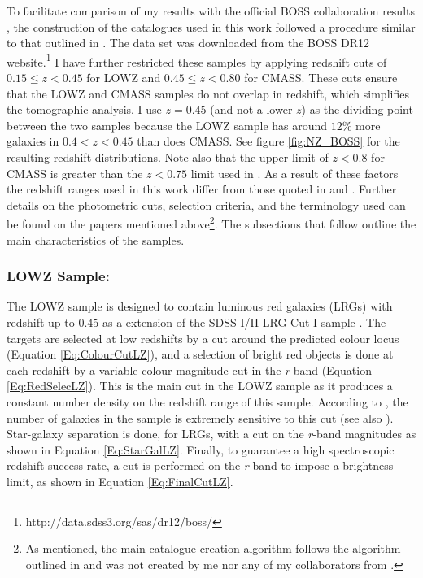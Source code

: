 To facilitate comparison of my results with the official BOSS collaboration results \citep{2016BOSSCosmology}, the construction of the catalogues used in this work followed a procedure similar to that outlined in \cite{BOSSCatalogue2016}. The data set was downloaded from the BOSS DR12 website.\footnote{http://data.sdss3.org/sas/dr12/boss/} I have further restricted these samples by applying redshift cuts of $0.15 \leq z < 0.45$ for LOWZ and $0.45 \leq z < 0.80$ for CMASS. These cuts ensure that the LOWZ and CMASS samples do not overlap in redshift, which simplifies the tomographic analysis. I use $z = 0.45$ (and not a lower $z$) as the dividing point between the two samples because the LOWZ sample has around $12\%$ more galaxies in $0.4 < z < 0.45$ than does CMASS. See figure \ref{fig:NZ_BOSS} for the resulting redshift distributions. Note also that the upper limit of $z < 0.8$ for CMASS is greater than the $z < 0.75$ limit used in \cite{BOSSCatalogue2016}. As a result of these factors the redshift ranges used in this work differ from those quoted in \cite{BOSSCatalogue2016} and \cite{2016BOSSCosmology}. Further details on the photometric cuts, selection criteria, and the terminology used can be found on the papers mentioned above\footnote{As mentioned, the main catalogue creation algorithm follows the algorithm outlined in \cite{BOSSCatalogue2016} and was not created by me nor any of my collaborators from \cite{2018LoureiroBOSS}.}. The subsections that follow outline the main characteristics of the samples.

\subsubsection{LOWZ Sample:}
The LOWZ sample is designed to contain luminous red galaxies (LRGs) with redshift up to $0.45$ as a extension of the SDSS-I/II LRG Cut I sample \citep{2001Eisenstein}. The targets are selected at low redshifts by a cut around the predicted colour locus (Equation \ref{Eq:ColourCutLZ}), and a selection of bright red objects is done at each redshift by a variable colour-magnitude cut in the \textit{r}-band (Equation \ref{Eq:RedSelecLZ}). This is the main cut in the LOWZ sample as it produces a constant number density on the redshift range of this sample. According to \cite{BOSSCatalogue2016}, the number of galaxies in the sample is extremely sensitive to this cut (see also \cite{2013ROSS}). Star-galaxy separation is done, for LRGs, with a cut on the \textit{r}-band magnitudes as shown in Equation \eqref{Eq:StarGalLZ}. Finally, to guarantee a high spectroscopic redshift success rate, a cut is performed on the \textit{r}-band to impose a brightness limit, as shown in Equation \eqref{Eq:FinalCutLZ}.


